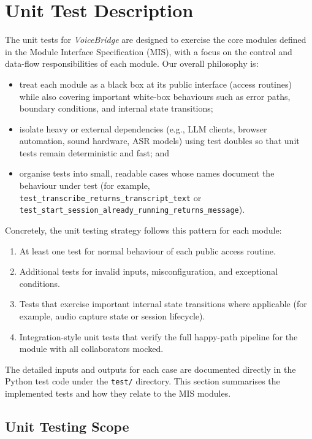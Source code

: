 \documentclass[12pt, titlepage]{article}
\begin{document}
\section{Unit Test Description}

The unit tests for \emph{VoiceBridge} are designed to exercise the core modules defined in the Module Interface Specification (MIS), with a focus on the control and data-flow responsibilities of each module. Our overall philosophy is:
\begin{itemize}
  \item treat each module as a black box at its public interface (access routines) while also covering important white-box behaviours such as error paths, boundary conditions, and internal state transitions;
  \item isolate heavy or external dependencies (e.g., LLM clients, browser automation, sound hardware, ASR models) using test doubles so that unit tests remain deterministic and fast; and
  \item organise tests into small, readable cases whose names document the behaviour under test (for example, \texttt{test\_transcribe\_returns\_transcript\_text} or \texttt{test\_start\_session\_already\_running\_returns\_message}).
\end{itemize}

Concretely, the unit testing strategy follows this pattern for each module:
\begin{enumerate}
  \item At least one test for normal behaviour of each public access routine.
  \item Additional tests for invalid inputs, misconfiguration, and exceptional conditions.
  \item Tests that exercise important internal state transitions where applicable (for example, audio capture state or session lifecycle).
  \item Integration-style unit tests that verify the full happy-path pipeline for the module with all collaborators mocked.
\end{enumerate}
%
The detailed inputs and outputs for each case are documented directly in the Python test code under the \texttt{test/} directory. This section summarises the implemented tests and how they relate to the MIS modules.

\subsection{Unit Testing Scope}
\end{document}
